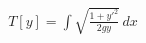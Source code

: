 \documentclass[preview]{standalone}
\begin{document}
\begin{align*}
T[y] = \int \sqrt{\frac{1 + y'^2}{2gy}} \, dx
\end{align*}
\end{document}

